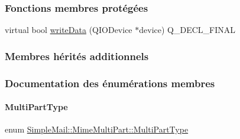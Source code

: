 \subsubsection*{Fonctions membres protégées}
\begin{DoxyCompactItemize}
\item 
virtual bool \hyperlink{class_simple_mail_1_1_mime_multi_part_acbd14f495f45d946eaf779d680bd7ce1}{write\+Data} (Q\+I\+O\+Device $\ast$device) Q\+\_\+\+D\+E\+C\+L\+\_\+\+F\+I\+N\+AL
\end{DoxyCompactItemize}
\subsubsection*{Membres hérités additionnels}


\subsubsection{Documentation des énumérations membres}
\mbox{\label{class_simple_mail_1_1_mime_multi_part_a6bef6836f893f87c64c4ff0cb9a93e53}} 
\paragraph{\texorpdfstring{Multi\+Part\+Type}{MultiPartType}}
{\footnotesize\ttfamily enum \hyperlink{class_simple_mail_1_1_mime_multi_part_a6bef6836f893f87c64c4ff0cb9a93e53}{Simple\+Mail\+::\+Mime\+Multi\+Part\+::\+Multi\+Part\+Type}}


